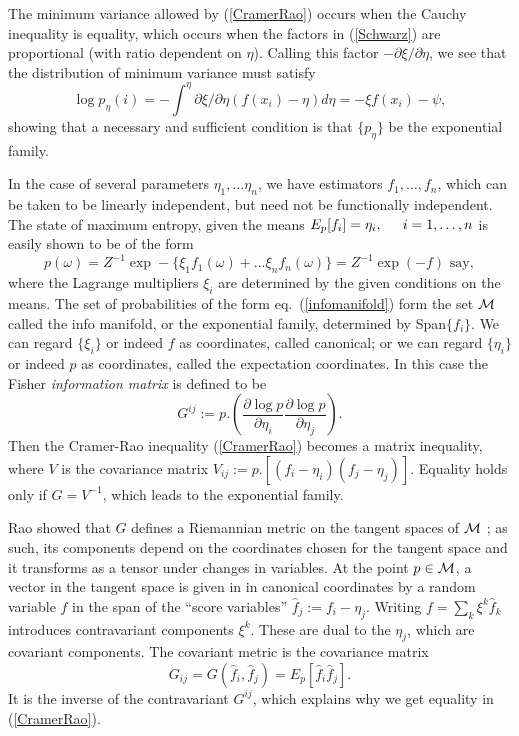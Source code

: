 \documentclass[12pt]{article}
\begin{document}
The minimum variance allowed by (\ref{CramerRao}) occurs when the Cauchy
inequality is equality, which occurs when the factors in (\ref{Schwarz})
are proportional (with ratio dependent on $\eta$). Calling this factor
$-\partial\xi/\partial\eta$, we see that the distribution of minimum
variance must satisfy
\begin{equation}
\log p_\eta(i)=-\int^\eta \partial\xi/\partial\eta(f(x_i)-\eta)d\eta=
-\xi f(x_i)-\psi,
\end{equation}
showing that a necessary and sufficient condition is that $\{p_\eta\}$ be the
exponential family.




In the case of several parameters $\eta_1,\ldots\eta_n$, we have
estimators $f_1,\ldots,f_n$, which can
be taken to be linearly independent, but need not be functionally
independent. The state of maximum entropy, given the means $E_p[f_i]=\eta_i,
\hspace{.2in}i=1,\ldots,n$ is easily shown to be of the form
\begin{equation}
p(\omega)=Z^{-1}\exp-\{\xi_1f_1(\omega)+\ldots\xi_nf_n(\omega)\}=Z^{-1}\exp
(-f)\mbox{ say},
\label{infomanifold}
\end{equation}
where the Lagrange multipliers $\xi_i$ are determined by the given conditions
on the means. The set of probabilities of the form
eq.~(\ref{infomanifold}) form the set ${\cal M}$
called the info manifold, or the exponential family, determined by
Span$\{f_i\}$. We can regard $\{\xi_i\}$ or indeed $f$ as coordinates,
called canonical; or we can regard $\{\eta_i\}$ or indeed $p$ as coordinates,
called the expectation coordinates. In this case the Fisher {\em information
matrix} is defined to be
\begin{equation}
G^{ij}:=p.\left(\frac{\partial \log p}{\partial\eta_i}\frac{\partial\log p}{
\partial\eta_j}\right).
\end{equation}
Then the Cramer-Rao inequality (\ref{CramerRao}) becomes a matrix inequality,
where $V$ is the covariance matrix $V_{ij}:=p.[(f_i-\eta_i)(f_j-\eta_j)]$.
Equality holds only if $G=V^{-1}$, which leads to the exponential family. 

Rao showed that $G$  defines a Riemannian metric on
the tangent spaces of ${\cal M}$ \cite{Ingarden2}; as such, its components
depend on the coordinates chosen for the tangent space and it transforms
as a tensor under changes in variables.
At the point $p\in{\cal M}$, a vector in the tangent space is given in
in canonical coordinates by a random
variable $f$ in the span of the ``score variables'' $\hat{f}_j:=f_i-\eta_j$.
Writing $f=\sum_k\xi^k\hat{f}_k$ introduces contravariant components $\xi^k$.
These are dual to the $\eta_j$, which are covariant components.
The covariant metric is the covariance matrix
\begin{equation}
G_{ij}=G(\hat{f}_i,\hat{f}_j)=E_p[\hat{f}_i\hat{f}_j].
\end{equation}
It is the inverse of the contravariant $G^{ij}$, which explains why we get
equality in (\ref{CramerRao}).
\end{document}
